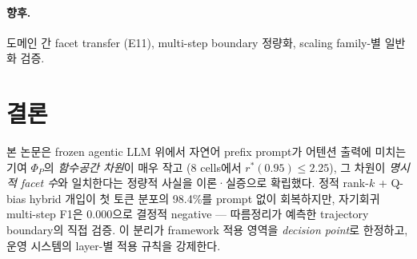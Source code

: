 \documentclass[11pt]{article}
\theoremstyle{definition}
\newcommand{\Phip}{\Phi_P}
\begin{document}
\paragraph{향후.} 도메인 간 facet transfer (E11), multi-step boundary 정량화, scaling family-별 일반화 검증.

\section{결론}
\label{sec:conclusion}

본 논문은 frozen agentic LLM 위에서 자연어 prefix prompt가 어텐션 출력에 미치는 기여 $\Phip$의 \emph{함수공간 차원}이 매우 작고 (8 cells에서 $r^*(0.95) \le 2.25$), 그 차원이 \emph{명시적 facet 수}와 일치한다는 정량적 사실을 이론·실증으로 확립했다. 정적 rank-$k$ + Q-bias hybrid 개입이 첫 토큰 분포의 98.4\%를 prompt 없이 회복하지만, 자기회귀 multi-step F1은 0.000으로 결정적 negative — 따름정리가 예측한 trajectory boundary의 직접 검증. 이 분리가 framework 적용 영역을 \emph{decision point}로 한정하고, 운영 시스템의 layer-별 적용 규칙을 강제한다.
\end{document}
